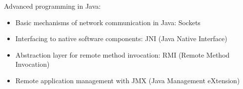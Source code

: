 Advanced programming in Java:
\begin{itemize}
    \item Basic mechanisms of network communication in Java: Sockets
    \item Interfacing to native software components: JNI (Java Native Interface)
    \item Abstraction layer for remote method invocation: RMI (Remote Method Invocation)
    \item Remote application management with JMX (Java Management eXtension)
\end{itemize}